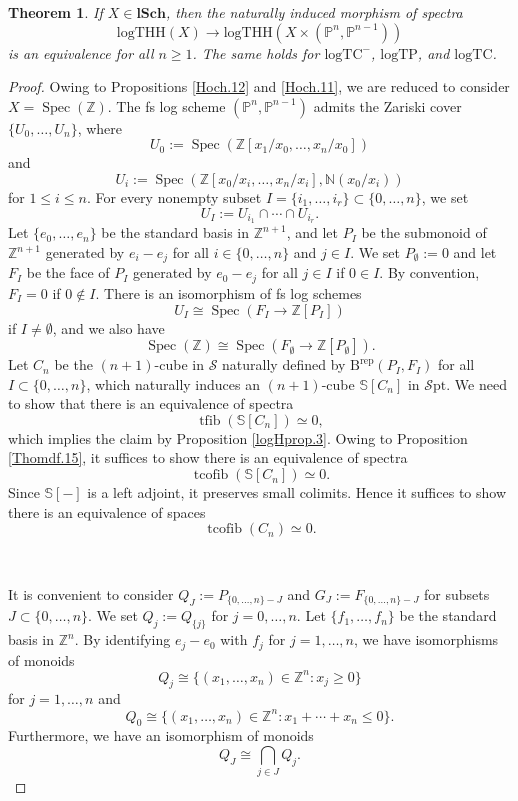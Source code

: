 \documentclass[11pt, a4paper]{amsart}
\newtheorem{thm}{Theorem}[subsection]
\theoremstyle{definition}
\numberwithin{equation}{subsection}
\newcommand{\N}{\mathbb{N}}
\newcommand{\Z}{\mathbb{Z}}
\renewcommand{\P}{\mathbb{P}}
\newcommand{\lSch}{\mathbf{lSch}}
\providecommand{\Spec}[1]{\operatorname{Spec}(#1)} 	%
\newcommand{\Brep}{\operatorname{B^{rep}}}
\newcommand{\Sphere}{\mathbb{S}}
\newcommand{\logTHH}{\mathrm{logTHH}}
\newcommand{\logTC}{\mathrm{logTC}}
\newcommand{\logTP}{\mathrm{logTP}}
\newcommand{\infSpc}{\mathcal{S}}
\newcommand{\infSpt}{\mathcal{S}\mathrm{pt}}
\newcommand{\tcofib}{\operatorname{tcofib}}
\newcommand{\tfib}{\operatorname{tfib}}
\begin{document}
\begin{thm}
\label{Hoch.13}
If $X\in \lSch$, then the naturally induced morphism of spectra
\[
\logTHH(X)
\to
\logTHH(X\times (\P^n,\P^{n-1}))
\]
is an equivalence for all $n\geq 1$.
The same holds for $\logTC^-$, $\logTP$, and $\logTC$.
\end{thm}
\begin{proof}
Owing to Propositions \ref{Hoch.12} and \ref{Hoch.11}, we are reduced to consider $X=\Spec{\Z}$.
The fs log scheme $(\P^n,\P^{n-1})$ admits the Zariski cover $\{U_0,\ldots,U_n\}$,
where
\[
U_0:=\Spec{\Z[x_1/x_0,\ldots,x_n/x_0]}
\]
and
\[
U_i:=\Spec{\Z[x_0/x_i,\ldots,x_n/x_i],\N(x_0/x_i)}
\]
for $1\leq i\leq n$.
For every nonempty subset $I=\{i_1,\ldots,i_r\}\subset \{0,\ldots,n\}$, we set
\[
U_I:=U_{i_1}\cap \cdots \cap U_{i_r}.
\]
Let $\{e_0,\ldots,e_n\}$ be the standard basis in $\Z^{n+1}$, 
and let $P_I$ be the submonoid of $\Z^{n+1}$ generated by $e_i-e_j$ for all $i\in \{0,\ldots,n\}$ and $j\in I$.
We set $P_\emptyset := 0$ and let 
$F_I$ be the face of $P_I$ generated by $e_0-e_j$ for all $j\in I$ if $0\in I$.
By convention, 
$F_I=0$ if $0\notin I$.
There is an isomorphism of fs log schemes
\[
U_I
\cong
\Spec{F_I\to \Z[P_I]}
\]
if $I\neq \emptyset$, 
and we also have
\[
\Spec{\Z}
\cong
\Spec{F_\emptyset \to \Z[P_\emptyset]}.
\]
Let $C_n$ be the $(n+1)$-cube in $\infSpc$ naturally defined by $\Brep(P_I,F_I)$ for all $I\subset \{0,\ldots,n\}$,
which naturally induces an $(n+1)$-cube $\Sphere[C_n]$ in $\infSpt$.
We need to show that there is an equivalence of spectra
\[
\tfib(\Sphere[C_n])
\simeq
0,
\]
which implies the claim by Proposition \ref{logHprop.3}.
Owing to Proposition \ref{Thomdf.15}, it suffices to show there is an equivalence of spectra
\[
\tcofib(\Sphere[C_n])
\simeq
0.
\]
Since $\Sphere[-]$ is a left adjoint,
it preserves small colimits.
Hence it suffices to show there is an equivalence of spaces
\begin{equation}
\label{Hoch.13.6}
\tcofib(C_n)
\simeq
0.
\end{equation}

\

It is convenient to consider $Q_J:=P_{\{0,\ldots,n\}-J}$ and $G_J:=F_{\{0,\ldots,n\}-J}$ for subsets 
$J\subset \{0,\ldots,n\}$.
We set $Q_j:=Q_{\{j\}}$ for $j=0,\ldots,n$.
Let $\{f_1,\ldots,f_n\}$ be the standard basis in $\Z^n$.
By identifying $e_j-e_0$ with $f_j$ for $j=1,\ldots,n$, we have isomorphisms of monoids
\[
Q_j
\cong
\{ (x_1,\ldots,x_n)\in \Z^n : x_j\geq 0 \}
\]
for $j=1,\ldots,n$ and
\[
Q_0
\cong
\{ (x_1,\ldots,x_n)\in \Z^n : x_1+\cdots+x_n \leq 0\}.
\]
Furthermore, we have an isomorphism of monoids
\[
Q_J
\cong
\bigcap_{j\in J} Q_j.
\]


\end{proof}
\end{document}
